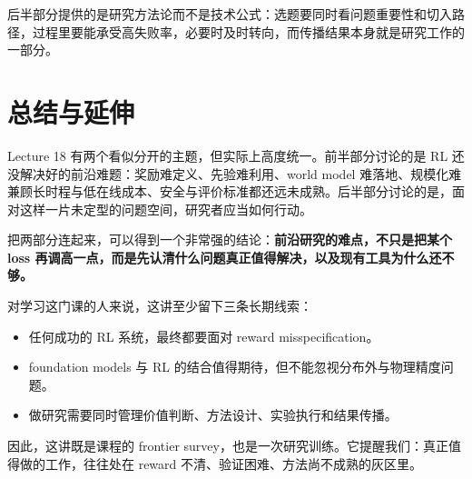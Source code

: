\documentclass[a4paper]{article}
\begin{document}
后半部分提供的是研究方法论而不是技术公式：选题要同时看问题重要性和切入路径，过程里要能承受高失败率，必要时及时转向，而传播结果本身就是研究工作的一部分。

\section{总结与延伸}

Lecture 18 有两个看似分开的主题，但实际上高度统一。前半部分讨论的是 RL 还没解决好的前沿难题：奖励难定义、先验难利用、world model 难落地、规模化难兼顾长时程与低在线成本、安全与评价标准都还远未成熟。后半部分讨论的是，面对这样一片未定型的问题空间，研究者应当如何行动。

把两部分连起来，可以得到一个非常强的结论：\textbf{前沿研究的难点，不只是把某个 loss 再调高一点，而是先认清什么问题真正值得解决，以及现有工具为什么还不够。}

对学习这门课的人来说，这讲至少留下三条长期线索：
\begin{itemize}
\item 任何成功的 RL 系统，最终都要面对 reward misspecification。
\item foundation models 与 RL 的结合值得期待，但不能忽视分布外与物理精度问题。
\item 做研究需要同时管理价值判断、方法设计、实验执行和结果传播。
\end{itemize}

因此，这讲既是课程的 frontier survey，也是一次研究训练。它提醒我们：真正值得做的工作，往往处在 reward 不清、验证困难、方法尚不成熟的灰区里。
\end{document}
